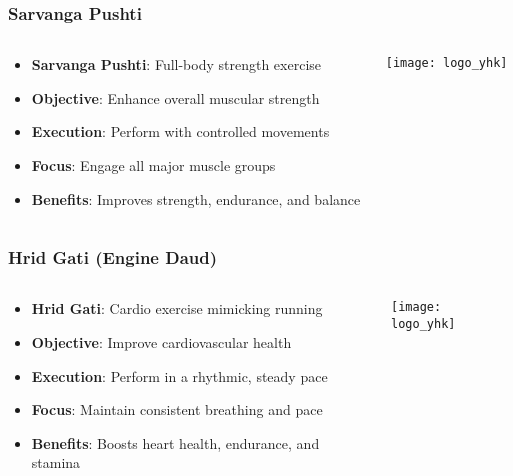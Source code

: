 \begin{frame}[fragile]\frametitle{Sarvanga Pushti}
\begin{columns}
    \begin{column}[T]{0.5\linewidth}
      \begin{itemize}
		\item \textbf{Sarvanga Pushti}: Full-body strength exercise
		\item \textbf{Objective}: Enhance overall muscular strength
		\item \textbf{Execution}: Perform with controlled movements
		\item \textbf{Focus}: Engage all major muscle groups
		\item \textbf{Benefits}: Improves strength, endurance, and balance
	  \end{itemize}
    \end{column}
    \begin{column}[T]{0.5\linewidth}
		\begin{center}
		\texttt{[image: logo\_yhk]}
		\end{center}	
    \end{column}
\end{columns}
\end{frame}

\begin{frame}[fragile]\frametitle{Hrid Gati (Engine Daud)}
\begin{columns}
    \begin{column}[T]{0.5\linewidth}
      \begin{itemize}
		\item \textbf{Hrid Gati}: Cardio exercise mimicking running
		\item \textbf{Objective}: Improve cardiovascular health
		\item \textbf{Execution}: Perform in a rhythmic, steady pace
		\item \textbf{Focus}: Maintain consistent breathing and pace
		\item \textbf{Benefits}: Boosts heart health, endurance, and stamina
	  \end{itemize}
    \end{column}
    \begin{column}[T]{0.5\linewidth}
		\begin{center}
		\texttt{[image: logo\_yhk]}
		\end{center}	
    \end{column}
\end{columns}
\end{frame}

